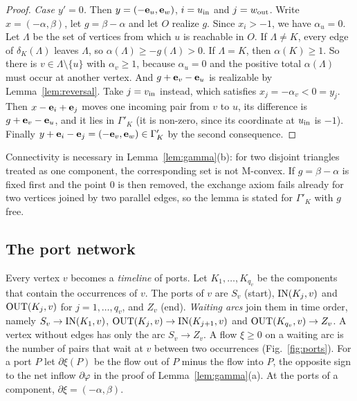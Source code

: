 \begin{proof}
\emph{Case $y'=0$.} Then $y=(-\mathbf{e}_u,\mathbf{e}_w)$, $i=u_{\mathrm{in}}$ and $j=w_{\mathrm{out}}$. Write $x=(-\alpha,\beta)$, let $g=\beta-\alpha$ and let $O$ realize $g$. Since $x_i>-1$, we have $\alpha_u=0$. Let $\Lambda$ be the set of vertices from which $u$ is reachable in $O$. If $\Lambda\ne K$, every edge of $\delta_K(\Lambda)$ leaves $\Lambda$, so $\alpha(\Lambda)\ge-g(\Lambda)>0$. If $\Lambda=K$, then $\alpha(K)\ge1$. So there is $v\in\Lambda\setminus\{u\}$ with $\alpha_v\ge1$, because $\alpha_u=0$ and the positive total $\alpha(\Lambda)$ must occur at another vertex. And $g+\mathbf{e}_v-\mathbf{e}_u$ is realizable by Lemma~\ref{lem:reversal}. Take $j=v_{\mathrm{in}}$ instead, which satisfies $x_j=-\alpha_v<0=y_j$. Then $x-\mathbf{e}_i+\mathbf{e}_j$ moves one incoming pair from $v$ to $u$, its difference is $g+\mathbf{e}_v-\mathbf{e}_u$, and it lies in $\Gamma'_K$ (it is non-zero, since its coordinate at $u_{\mathrm{in}}$ is $-1$). Finally $y+\mathbf{e}_i-\mathbf{e}_j=(-\mathbf{e}_v,\mathbf{e}_w)\in\Gamma'_K$ by the second consequence.
\end{proof}

\begin{remark}\label{rem:connected}
Connectivity is necessary in Lemma~\ref{lem:gamma}(b): for two disjoint triangles treated as one component, the corresponding set is not M-convex. If $g=\beta-\alpha$ is fixed first and the point $0$ is then removed, the exchange axiom fails already for two vertices joined by two parallel edges, so the lemma is stated for $\Gamma'_K$ with $g$ free.
\end{remark}

\subsection{The port network}\label{sec:ports}

Every vertex $v$ becomes a \emph{timeline} of ports. Let $K_1,\dots,K_{q_v}$ be the components that contain the occurrences of $v$. The ports of $v$ are $S_v$ (start), $\mathrm{IN}(K_j,v)$ and $\mathrm{OUT}(K_j,v)$ for $j=1,\dots,q_v$, and $Z_v$ (end). \emph{Waiting arcs} join them in time order, namely $S_v\to\mathrm{IN}(K_1,v)$, $\mathrm{OUT}(K_j,v)\to\mathrm{IN}(K_{j+1},v)$ and $\mathrm{OUT}(K_{q_v},v)\to Z_v$. A vertex without edges has only the arc $S_v\to Z_v$. A flow $\xi\ge0$ on a waiting arc is the number of pairs that wait at $v$ between two occurrences (Fig.~\ref{fig:ports}). For a port $P$ let $\partial\xi(P)$ be the flow out of $P$ minus the flow into $P$, the opposite sign to the net inflow $\partial\varphi$ in the proof of Lemma~\ref{lem:gamma}(a). At the ports of a component, $\partial\xi=(-\alpha,\beta)$.

